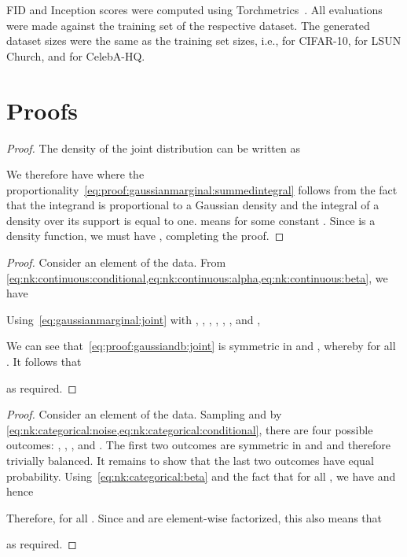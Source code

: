 \documentclass[10pt,twocolumn,letterpaper]{article}
\begin{document}
FID and Inception scores were computed using Torchmetrics~\cite{torchmetrics}.
All evaluations were made against the training set of the respective dataset.
The generated dataset sizes were the same as the training set sizes, i.e.,  for CIFAR-10,  for LSUN Church, and  for CelebA-HQ.


\section{Proofs}\label{app:proofs}

\gaussianmarginal*

\begin{proof}
  The density of the joint distribution can be written as
  
  We therefore have
  \allowdisplaybreaks 
  where the proportionality~\eqref{eq:proof:gaussianmarginal:summedintegral} follows from the fact that the integrand is proportional to a Gaussian density and the integral of a density over its support is equal to one.
   means  for some constant .
  Since  is a density function, we must have , completing the proof.
\end{proof}

\gaussiandb*

\begin{proof}
  Consider an element  of the data.
  From \cref{eq:nk:continuous:conditional,eq:nk:continuous:alpha,eq:nk:continuous:beta}, we have
  
  Using~\eqref{eq:gaussianmarginal:joint} with , , , , , , and ,
  
  We can see that~\eqref{eq:proof:gaussiandb:joint} is symmetric in  and , whereby  for all .
  It follows that
  
  as required.
\end{proof}

\categoricaldb*

\begin{proof}
  Consider an element  of the data.
  Sampling  and  by \cref{eq:nk:categorical:noise,eq:nk:categorical:conditional}, there are four possible outcomes: , , , and .
  The first two outcomes are symmetric in  and  and therefore trivially balanced.
  It remains to show that the last two outcomes have equal probability.
  Using~\eqref{eq:nk:categorical:beta} and the fact that  for all , we have  and hence
  
  Therefore,  for all .
  Since  and  are element-wise factorized, this also means that
  
  as required.
\end{proof}
\end{document}
